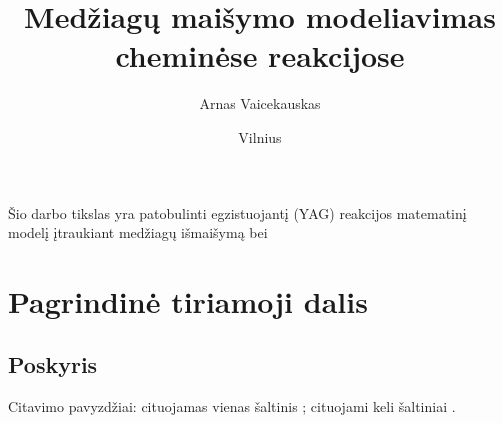 \documentclass{VUMIFInfKursinis}
\institute{Informatikos institutas}  %
\title{Medžiagų maišymo modeliavimas cheminėse
reakcijose}
\author{Arnas Vaicekauskas}
\date{Vilnius \\ \the\year}
\begin{document}
\maketitle

\tableofcontents



%
%
%
%
%

Šio darbo tikslas yra patobulinti egzistuojantį (YAG) reakcijos matematinį modelį įtraukiant medžiagų išmaišymą bei 

\section{Pagrindinė tiriamoji dalis}

\subsection{Poskyris}
Citavimo pavyzdžiai: cituojamas vienas šaltinis \cite{PvzStraipsnLt}; cituojami
keli šaltiniai \cite{PvzStraipsnEn, PvzKonfLt, PvzKonfEn, PvzKnygLt, PvzKnygEn,
PvzElPubLt, PvzElPubEn, PvzMagistrLt, PvzPhdEn}.

\end{document}
